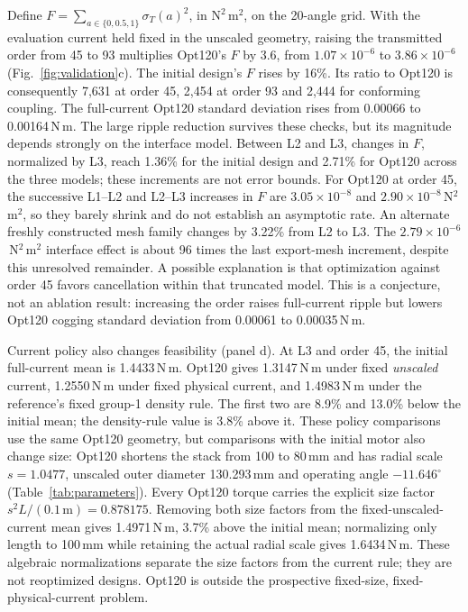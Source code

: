 \documentclass{anvil-paper}
\begin{document}
Define $F=\sum_{a\in\{0,0.5,1\}}\sigma_T(a)^2$, in
$\mathrm{N^2\,m^2}$, on the 20-angle grid. With the evaluation current
held fixed in the unscaled geometry, raising the transmitted order from
45 to 93 multiplies Opt120's $F$ by 3.6, from $1.07\times10^{-6}$ to
$3.86\times10^{-6}$ (Fig.~\ref{fig:validation}c). The initial design's
$F$ rises by 16\%. Its ratio to Opt120 is consequently 7,631 at order 45,
2,454 at order 93 and 2,444 for conforming coupling. The full-current
Opt120 standard deviation rises from 0.00066 to 0.00164\,N\,m.
The large ripple reduction survives these checks, but its magnitude
depends strongly on the interface model. Between L2 and L3, changes in
$F$, normalized by L3, reach 1.36\% for the initial design and 2.71\%
for Opt120 across the three models; these increments are not error bounds.
For Opt120 at order 45, the successive L1--L2 and L2--L3 increases in $F$
are $3.05\times10^{-8}$ and $2.90\times10^{-8}$\,N$^2$\,m$^2$,
so they barely shrink and do not establish an asymptotic rate. An alternate
freshly constructed mesh family changes by 3.22\% from L2 to L3.
The $2.79\times10^{-6}$\,N$^2$\,m$^2$ interface effect is about
96 times the last export-mesh increment, despite this unresolved remainder.
A possible explanation is that optimization against order 45 favors
cancellation within that truncated model. This is a conjecture, not an
ablation result: increasing the order raises full-current ripple but
lowers Opt120 cogging standard deviation from 0.00061 to 0.00035\,N\,m.

Current policy also changes feasibility (panel d). At L3 and order 45,
the initial full-current mean is 1.4433\,N\,m. Opt120 gives 1.3147\,N\,m
under fixed \emph{unscaled} current, 1.2550\,N\,m under fixed physical
current, and 1.4983\,N\,m under the reference's fixed group-1 density rule.
The first two are 8.9\% and 13.0\% below the initial mean; the density-rule
value is 3.8\% above it. These policy comparisons use the same Opt120
geometry, but comparisons with the initial motor also change size:
Opt120 shortens the stack from 100 to 80\,mm and has radial scale
$s=1.0477$, unscaled outer diameter 130.293\,mm and operating angle
$-11.646^\circ$ (Table~\ref{tab:parameters}). Every Opt120 torque carries
the explicit size factor $s^2L/(0.1\,\mathrm{m})=0.878175$.
Removing both size factors from the fixed-unscaled-current mean gives
1.4971\,N\,m, 3.7\% above the initial mean; normalizing only length to
100\,mm while retaining the actual radial scale gives 1.6434\,N\,m.
These algebraic normalizations separate the size factors from the current
rule; they are not reoptimized designs. Opt120 is outside the prospective
fixed-size, fixed-physical-current problem.
\end{document}
